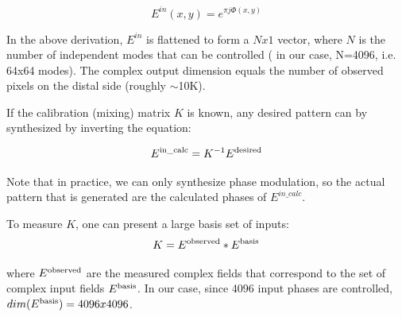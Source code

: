 \documentclass[10pt]{article}
\begin{document}
\[{E^{in}}\left( {x,y} \right) = {e^{\pi j\Phi \left( {x,y} \right)}}\]

In the above derivation, $E^{in}$ is flattened to form a $Nx1$ vector, where $N$ is the number of independent modes that can be controlled (
in our case, N=4096, i.e. 64x64 modes). The complex output dimension equals the number of observed pixels on the distal side (roughly $\sim$10K).

If the calibration (mixing) matrix $K$ is known, any desired pattern can by synthesized by inverting the equation: 

\[{E^{{\rm{in\_calc}}}} = {K^{ - 1}}{E^{{\rm{desired}}}}\]

Note that in practice, we can only synthesize phase modulation, so the actual pattern that is generated are the calculated phases of  $E^{in\_calc}$.

To measure $K$, one can present a large basis set of inputs:
\[K = {E^{{\rm{observed}}}}*{E^{{\rm{basis}}}}\]

where $E^{\rm{observed}}$ are the measured complex fields that correspond to the set of  complex input fields $E^{\rm{basis}}$. In our case, since 4096 input phases are controlled, $dim( E^{{\rm{basis}}}) = 4096x4096$.
\end{document}

